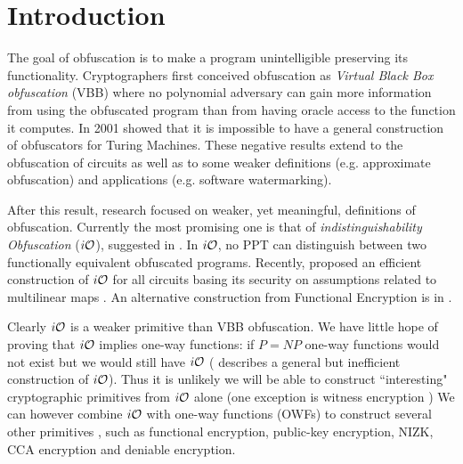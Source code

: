 
\section{Introduction}
The goal of obfuscation is to make a program unintelligible preserving its functionality.
Cryptographers first conceived obfuscation as \emph{Virtual Black Box obfuscation} (VBB) where
no polynomial adversary can gain more information from using the obfuscated program than from having
oracle access to the function it computes. In 2001 \cite{VBB-imp} showed that it is impossible to have a general construction of obfuscators for Turing Machines. These negative results extend to the obfuscation of circuits as well as to some weaker definitions (e.g. approximate obfuscation) and applications (e.g. software watermarking).

After this result, research focused on weaker, yet meaningful, definitions of
obfuscation. Currently the most promising one is that of \emph{indistinguishability Obfuscation} ($i\mathcal{O}$), suggested in \cite{VBB-imp}. In $i\mathcal{O}$, no PPT can distinguish between two functionally equivalent obfuscated programs. Recently, \cite{garg2013candidate} proposed an efficient construction of $i\mathcal{O}$ for all circuits basing its security on assumptions related to multilinear maps \cite{garg2013candidatemulti}. An alternative construction from Functional Encryption is in \cite{iO-FE}.

Clearly $i\mathcal{O}$ is a weaker primitive than VBB obfuscation. We have little hope of proving that $i\mathcal{O}$ implies one-way functions: if $P = NP$ one-way functions would not exist but we would still have $i\mathcal{O}$ (\cite{VBB-imp} describes a general but inefficient construction of $i\mathcal{O}$). 
Thus it is unlikely we will be able to construct ``interesting" cryptographic primitives from
$i\mathcal{O}$ alone (one exception is witness encryption \cite{garg2013witness}) 
We can however combine $i\mathcal{O}$ with one-way functions (OWFs) to construct several other primitives \cite{iO-deniable}, such as functional encryption, public-key encryption, NIZK, CCA encryption and deniable encryption.


